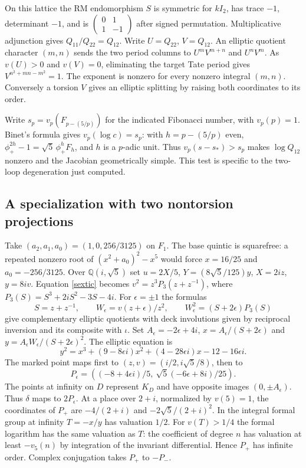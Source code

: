 \documentclass[11pt]{article}
\newcommand{\Q}{\mathbb Q}
\begin{document}
On this lattice the RM endomorphism $S$ is symmetric for $kI_2$,
has trace $-1$, determinant $-1$, and is
$\left(\begin{smallmatrix}0&1\\1&-1\end{smallmatrix}\right)$
after signed permutation. Multiplicative adjunction gives
$Q_{11}/Q_{22}=Q_{12}$. Write $U=Q_{22}$, $V=Q_{12}$.
An elliptic quotient character $(m,n)$ sends the two period
columns to $U^mV^{m+n}$ and $U^nV^m$. As $v(U)>0$ and $v(V)=0$,
eliminating the target Tate period gives $V^{n^2+mn-m^2}=1$.
The exponent is nonzero for every nonzero integral $(m,n)$.
Conversely a torsion $V$ gives an elliptic splitting by raising both
coordinates to its order.

Write $s_p=v_p(F_{p-(5/p)})$ for the indicated Fibonacci number, with
$v_p(p)=1$. Binet's formula gives $v_p(\log c)=s_p$: with
$h=p-(5/p)$ even, $\phi_+^{2h}-1=\sqrt5\,\phi_+^h F_h$, and $h$ is a
$p$-adic unit. Thus $v_p(s-s_*)>s_p$ makes $\log Q_{12}$ nonzero and
the Jacobian geometrically simple. This test is specific to the
two-loop degeneration just computed.

\subsection{A specialization with two nontorsion projections}
Take $(a_2,a_1,a_0)=(1,0,256/3125)$ on $F_1$. The base quintic is
squarefree: a repeated nonzero root of $(x^2+a_0)^2-x^5$ would force
$x=16/25$ and $a_0=-256/3125$. Over $\Q(i,\sqrt5)$ set $u=2X/5$,
$Y=(8\sqrt5/125)y$, $X=2iz$, $y=8iv$. Equation \eqref{sextic} becomes
$v^2=z^3P_3(z+z^{-1})$, where $P_3(S)=S^3+2iS^2-3S-4i$. For
$\epsilon=\pm1$ the formulas
\[
 S=z+z^{-1},\qquad W_\epsilon=v(z+\epsilon)/z^2,\qquad
 W_\epsilon^2=(S+2\epsilon)P_3(S)
\]
give complementary elliptic quotients with deck involutions given by
reciprocal inversion and its composite with $\iota$. Set
$A_\epsilon=-2\epsilon+4i$, $x=A_\epsilon/(S+2\epsilon)$ and
$y=A_\epsilon W_\epsilon/(S+2\epsilon)^2$. The elliptic equation is
\[
 y^2=x^3+(9-8\epsilon i)x^2+(4-28\epsilon i)x-12-16\epsilon i .
\]
The marked point maps first to $(z,v)=(i/2,i\sqrt5/8)$, then to
\[
 P_\epsilon=\left((-8+4\epsilon i)/5,\ \sqrt5(-6\epsilon+8i)/25\right).
\]
The points at infinity on $D$ represent $K_D$ and have opposite images
$(0,\pm A_\epsilon)$. Thus $\delta$ maps to $2P_\epsilon$. At a place
over $2+i$, normalized by $v(5)=1$, the coordinates of $P_+$ are
$-4/(2+i)$ and $-2\sqrt5/(2+i)^2$. In the integral formal group
at infinity $T=-x/y$ has valuation $1/2$. For $v(T)>1/4$ the formal
logarithm has the same valuation as $T$: the coefficient of degree $n$
has valuation at least $-v_5(n)$ by integration of the invariant
differential. Hence $P_+$ has infinite order. Complex conjugation
takes $P_+$ to $-P_-$.
\end{document}
